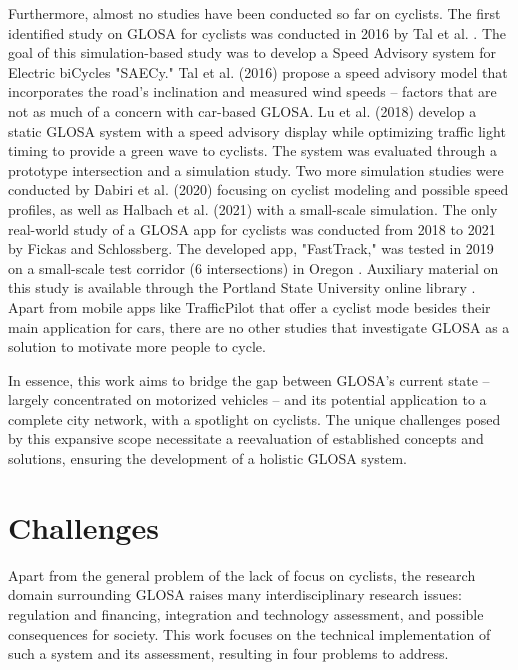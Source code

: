 Furthermore, almost no studies have been conducted so far on cyclists. The first identified study on GLOSA for cyclists was conducted in 2016 by Tal et al. \cite{tal_vehicular-communications-based_2016}. The goal of this simulation-based study was to develop a Speed Advisory system for Electric biCycles "SAECy." Tal et al. (2016) \cite{tal_vehicular-communications-based_2016} propose a speed advisory model that incorporates the road's inclination and measured wind speeds -- factors that are not as much of a concern with car-based GLOSA. Lu et al. (2018) \cite{lu_enhancement_2018} develop a static GLOSA system with a speed advisory display while optimizing traffic light timing to provide a green wave to cyclists. The system was evaluated through a prototype intersection and a simulation study. Two more simulation studies were conducted by Dabiri et al. (2020) \cite{dabiri_optimized_2020} focusing on cyclist modeling and possible speed profiles, as well as Halbach et al. (2021) \cite{halbach_cooperative_2021} with a small-scale simulation. The only real-world study of a GLOSA app for cyclists was conducted from 2018 to 2021 by Fickas and Schlossberg. The developed app, "FastTrack," was tested in 2019 on a small-scale test corridor (6 intersections) in Oregon \cite{fickas_fast_2019}. Auxiliary material on this study is available through the Portland State University online library \cite{fickas_green_2021, fickas_using_2021, fickas_riding_2019, fickas_webinar_2019, fickas_data_2021, fickas_project_2018}. Apart from mobile apps like TrafficPilot that offer a cyclist mode besides their main application for cars, there are no other studies that investigate GLOSA as a solution to motivate more people to cycle. 

In essence, this work aims to bridge the gap between GLOSA's current state -- largely concentrated on motorized vehicles -- and its potential application to a complete city network, with a spotlight on cyclists. The unique challenges posed by this expansive scope necessitate a reevaluation of established concepts and solutions, ensuring the development of a holistic GLOSA system.

\section{Challenges}

Apart from the general problem of the lack of focus on cyclists, the research domain surrounding GLOSA raises many interdisciplinary research issues: regulation and financing, integration and technology assessment, and possible consequences for society. This work focuses on the technical implementation of such a system and its assessment, resulting in four problems to address.

